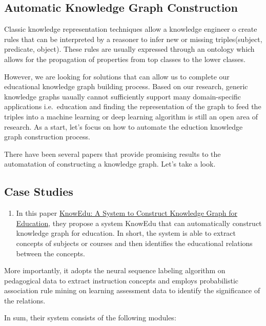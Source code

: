 \documentclass[]{book}
\providecommand{\tightlist}{%
  \setlength{\itemsep}{0pt}\setlength{\parskip}{0pt}}
\theoremstyle{definition}
\theoremstyle{definition}
\theoremstyle{definition}
\theoremstyle{remark}
\begin{document}
\subsection{Automatic Knowledge Graph
Construction}\label{automatic-knowledge-graph-construction}

Classic knowledge representation techniques allow a knowledge engineer o
create rules that can be interpreted by a reasoner to infer new or
missing triples(subject, predicate, object). These rules are usually
expressed through an ontology which allows for the propagation of
properties from top classes to the lower classes.

However, we are looking for solutions that can allow us to complete our
educational knowledge graph building process. Based on our research,
generic knowledge graphs uaually cannot sufficiently support many
domain-specific applications i.e.~education and finding the
representation of the graph to feed the triples into a machine learning
or deep learning algorithm is still an open area of research. As a
start, let's focus on how to automate the eduction knowledge graph
construction process.

There have been several papers that provide promising results to the
automatation of constructing a knowledge graph. Let's take a look.

\subsection{Case Studies}\label{case-studies-5}

\begin{enumerate}
\def\labelenumi{\arabic{enumi}.}
\tightlist
\item
  In this paper
  \href{https://ieeexplore.ieee.org/document/8362657}{KnowEdu: A System
  to Construct Knowledge Graph for Education}, they propose a system
  KnowEdu that can automatically construct knowledge graph for
  education. In short, the system is able to extract concepts of
  subjects or courses and then identifies the educational relations
  between the concepts.
\end{enumerate}

More importantly, it adopts the neural sequence labeling algorithm on
pedagogical data to extract instruction concepts and employs
probabilistic association rule mining on learning assessment data to
identify the significance of the relations.

In sum, their system consists of the following modules:
\end{document}
